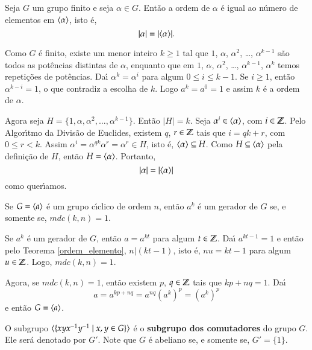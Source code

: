 \begin{proposicao}\label{ordem_de_elemento}
	Seja $G$ um grupo finito e seja $\alpha \in G$. Ent\~ao a ordem de $\alpha$ \'e igual ao n\'umero de elementos em $\langle{\alpha}\rangle$, isto \'e,
	\[
		|\alpha| = |\langle{\alpha}\rangle|.
	\]
\end{proposicao}
\begin{prova}
	Como $G$ \'e finito, existe um menor inteiro $k \ge 1$ tal que $1$, $\alpha$, $\alpha^2$, \dots, $\alpha^{k - 1}$ s\~ao todos as pot\^encias distintas de $\alpha$, enquanto que em $1$, $\alpha$, $\alpha^2$, \dots, $\alpha^{k - 1}$, $\alpha^k$ temos repeti\c{c}\~oes de pot\^encias. Da{\'\i} $\alpha^k = \alpha^i$ para algum $0 \le i \le k - 1$. Se $i \ge 1$, ent\~ao $\alpha^{k - i} = 1$, o que contradiz a escolha de $k$. Logo $a^k = a^0 = 1$ e assim $k$ \'e a ordem de $\alpha$.

	Agora seja $H = \{1, \alpha, \alpha^2, \dots, \alpha^{k - 1}\}$. Ent\~ao $|H| = k$. Seja $\alpha^i \in \langle{\alpha}\rangle$, com $i \in \mathbb{Z}$. Pelo Algor{\'\i}tmo da Divis\~ao de Euclides, existem $q$, $r \in \mathbb{Z}$ tais que $i = qk + r$, com $0 \le r < k$. Assim $\alpha^i = \alpha^{qk}\alpha^r = \alpha^r \in H$, isto \'e, $\langle{\alpha}\rangle \subseteq H$. Como $H \subseteq \langle{\alpha}\rangle$ pela defini\c{c}\~ao de $H$, ent\~ao $H = \langle{\alpha}\rangle$. Portanto,
	\[
		|\alpha| = |\langle{\alpha}\rangle|
	\]
	como quer{\'\i}amos.
\end{prova}

\begin{teorema}
	Se $G = \langle{a}\rangle$ \'e um grupo c{\'\i}clico de ordem $n$, ent\~ao $a^k$ \'e um gerador de $G$ se, e somente se, $mdc(k,n) = 1$.
\end{teorema}
\begin{prova}
	Se $a^k$ \'e um gerador de $G$, ent\~ao $a = a^{kt}$ para algum $t \in \mathbb{Z}$. Da{\'\i} $a^{kt - 1} = 1$ e ent\~ao pelo Teorema \ref{ordem_elemento}, $n | (kt -1)$, isto \'e, $nu = kt - 1$ para algum $u \in \mathbb{Z}$. Logo, $mdc(k,n) = 1$.

	Agora, se $mdc(k,n) = 1$, ent\~ao existem $p$, $q \in \mathbb{Z}$ tais que $kp + nq = 1$. Da{\'\i}
	\[
		a = a^{kp + nq} = a^{nq}(a^k)^p = (a^k)^p
	\]
	e ent\~ao $G = \langle{a}\rangle$.
\end{prova}

\begin{definicao}
	O subgrupo $\langle{\{xyx^{-1}y^{-1} \mid x, y \in G\}}\rangle$ \'e o \textbf{subgrupo dos comutadores} do grupo $G$. Ele ser\'a denotado por $G'$. Note que $G$ \'e abeliano se, e somente se, $G' = \{1\}$.
\end{definicao}



